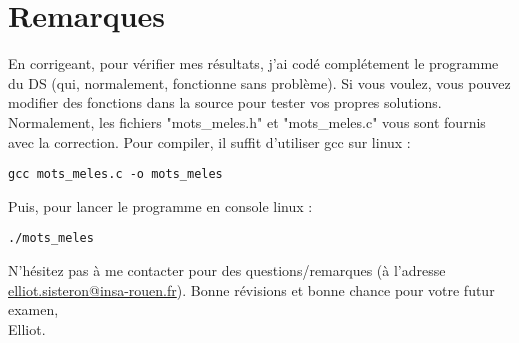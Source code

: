 \documentclass[a4paper,11pt]{article}
\begin{document}
\section*{Remarques}
En corrigeant, pour vérifier mes résultats, j'ai codé complétement le programme du DS (qui, normalement, fonctionne sans problème).
Si vous voulez, vous pouvez modifier des fonctions dans la source pour tester vos propres solutions.
Normalement, les fichiers "mots\_meles.h" et "mots\_meles.c" vous sont fournis avec la correction.
Pour compiler, il suffit d'utiliser gcc sur linux :
\begin{lstlisting}[caption=Compiler le programme]
gcc mots_meles.c -o mots_meles
\end{lstlisting}
Puis, pour lancer le programme en console linux :
\begin{lstlisting}[caption=Lancer le programme]
./mots_meles
\end{lstlisting}

N'hésitez pas à me contacter pour des questions/remarques (à l'adresse \href{mailto:elliot.sisteron@insa-rouen.fr}{elliot.sisteron@insa-rouen.fr}).
Bonne révisions et bonne chance pour votre futur examen,\\

Elliot.
\end{document}
